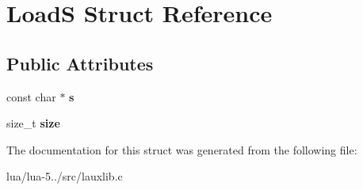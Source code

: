 \hypertarget{struct_load_s}{\section{Load\+S Struct Reference}
\label{struct_load_s}
}
\subsection*{Public Attributes}
\begin{DoxyCompactItemize}
\item 
\hypertarget{struct_load_s_a44ca6c7d2df4008707bdc388106a597f}{const char $\ast$ {\bfseries s}}\label{struct_load_s_a44ca6c7d2df4008707bdc388106a597f}

\item 
\hypertarget{struct_load_s_a40a688d5486de2f680cf56297af57b80}{size\+\_\+t {\bfseries size}}\label{struct_load_s_a40a688d5486de2f680cf56297af57b80}

\end{DoxyCompactItemize}


The documentation for this struct was generated from the following file\+:\begin{DoxyCompactItemize}
\item 
lua/lua-\/5../src/lauxlib.\+c\end{DoxyCompactItemize}
